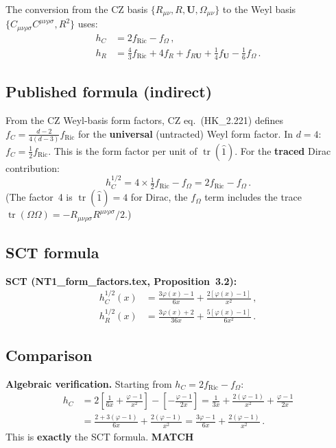 \documentclass[12pt,a4paper]{article}
\theoremstyle{definition}
\theoremstyle{remark}
\newcommand{\tr}{\operatorname{tr}}
\newcommand{\Rsq}{R_{\mu\nu\rho\sigma}R^{\mu\nu\rho\sigma}}
\newcommand{\Weylsq}{C_{\mu\nu\rho\sigma}C^{\mu\nu\rho\sigma}}
\newcommand{\match}{\textcolor{green!60!black}{\textbf{MATCH}}}
\begin{document}
The conversion from the CZ basis $\{R_{\mu\nu}, R, \mathbf{U}, \Omega_{\mu\nu}\}$
to the Weyl basis $\{\Weylsq, R^2\}$ uses:
\begin{align}
  h_C &= 2f_{\text{Ric}} - f_\Omega\,,\\
  h_R &= \tfrac{4}{3}f_{\text{Ric}} + 4f_R + f_{R\mathbf{U}}
          + \tfrac{1}{4}f_{\mathbf{U}} - \tfrac{1}{6}f_\Omega\,.
\end{align}

\subsection{Published formula (indirect)}

From the CZ Weyl-basis form factors, CZ eq.~(HK\_2.221) defines
$f_C = \frac{d-2}{4(d-3)}f_{\text{Ric}}$ for the \textbf{universal}
(untracted) Weyl form factor.  In $d=4$: $f_C = \frac{1}{2}f_{\text{Ric}}$.
This is the form factor per unit of $\tr(\hat{1})$.  For the \textbf{traced}
Dirac contribution:
\[
  h_C^{1/2} = 4 \times \tfrac{1}{2}f_{\text{Ric}} - f_\Omega
  = 2f_{\text{Ric}} - f_\Omega\,.
\]
(The factor~4 is $\tr(\hat{1}) = 4$ for Dirac, the $f_\Omega$ term
includes the trace $\tr(\Omega\Omega) = -\Rsq/2$.)

\subsection{SCT formula}

\noindent\textbf{SCT (NT1\_form\_factors.tex, Proposition~3.2):}
\begin{equation}
  \boxed{
  \begin{aligned}
  h_C^{1/2}(x) &= \frac{3\varphi(x)-1}{6x} + \frac{2[\varphi(x)-1]}{x^2}\,,\\[4pt]
  h_R^{1/2}(x) &= \frac{3\varphi(x)+2}{36x} + \frac{5[\varphi(x)-1]}{6x^2}\,.
  \end{aligned}
  }
\end{equation}

\subsection{Comparison}

\textbf{Algebraic verification.}
Starting from $h_C = 2f_{\text{Ric}} - f_\Omega$:
\begin{align*}
  h_C &= 2\!\left[\frac{1}{6x} + \frac{\varphi-1}{x^2}\right]
         - \left[-\frac{\varphi-1}{2x}\right]
       = \frac{1}{3x} + \frac{2(\varphi-1)}{x^2} + \frac{\varphi-1}{2x}\\
      &= \frac{2 + 3(\varphi-1)}{6x} + \frac{2(\varphi-1)}{x^2}
       = \frac{3\varphi-1}{6x} + \frac{2(\varphi-1)}{x^2}\,.
\end{align*}
This is \textbf{exactly} the SCT formula. \match
\end{document}
